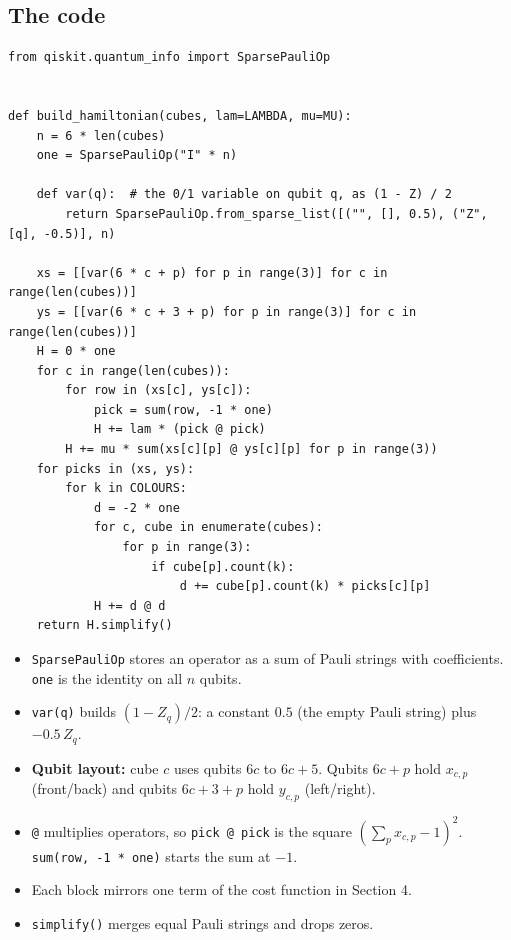 \documentclass[11pt]{article}
\newcommand{\code}[1]{\texttt{#1}}
\begin{document}
\subsection{The code}

\begin{lstlisting}
from qiskit.quantum_info import SparsePauliOp


def build_hamiltonian(cubes, lam=LAMBDA, mu=MU):
    n = 6 * len(cubes)
    one = SparsePauliOp("I" * n)

    def var(q):  # the 0/1 variable on qubit q, as (1 - Z) / 2
        return SparsePauliOp.from_sparse_list([("", [], 0.5), ("Z", [q], -0.5)], n)

    xs = [[var(6 * c + p) for p in range(3)] for c in range(len(cubes))]
    ys = [[var(6 * c + 3 + p) for p in range(3)] for c in range(len(cubes))]
    H = 0 * one
    for c in range(len(cubes)):
        for row in (xs[c], ys[c]):
            pick = sum(row, -1 * one)
            H += lam * (pick @ pick)
        H += mu * sum(xs[c][p] @ ys[c][p] for p in range(3))
    for picks in (xs, ys):
        for k in COLOURS:
            d = -2 * one
            for c, cube in enumerate(cubes):
                for p in range(3):
                    if cube[p].count(k):
                        d += cube[p].count(k) * picks[c][p]
            H += d @ d
    return H.simplify()
\end{lstlisting}

\begin{itemize}
  \item \code{SparsePauliOp} stores an operator as a sum of Pauli strings with
        coefficients. \code{one} is the identity on all $n$ qubits.
  \item \code{var(q)} builds $(1 - Z_q)/2$: a constant $0.5$ (the empty
        Pauli string) plus $-0.5\,Z_q$.
  \item \textbf{Qubit layout:} cube $c$ uses qubits $6c$ to $6c+5$. Qubits
        $6c + p$ hold $x_{c,p}$ (front/back) and qubits $6c + 3 + p$ hold
        $y_{c,p}$ (left/right).
  \item \code{@} multiplies operators, so \code{pick @ pick} is the square
        $(\sum_p x_{c,p} - 1)^2$. \code{sum(row, -1 * one)} starts the sum at
        $-1$.
  \item Each block mirrors one term of the cost function in Section 4.
  \item \code{simplify()} merges equal Pauli strings and drops zeros.
\end{itemize}
\end{document}
